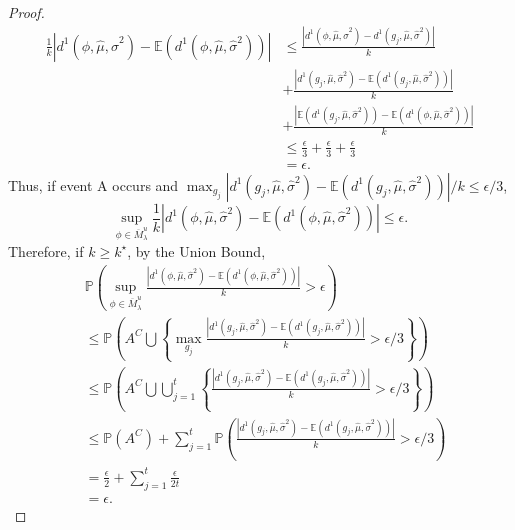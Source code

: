 \documentclass[10pt,a4paper]{amsart}
\begin{document}
\begin{proof}
\begin{equation*}
\begin{split}
           \frac{1}{k}\left |d^1(\phi,\hat{\mu},\hat{\sigma}^2)-\mathbb{E}\left ( d^1(\phi,\hat{\mu},\hat{\sigma}^2)\right )\right |&\leq \frac{ \left |d^1(\phi,\hat{\mu},\hat{\sigma}^2)-d^1(g_j,\hat{\mu},\hat{\sigma}^2) \right |}{k} \\
           & +\frac{\left | d^1(g_j,\hat{\mu},\hat{\sigma}^2)-\mathbb{E}\left ( d^1(g_j,\hat{\mu},\hat{\sigma}^2)\right ) \right |}{k}\\
           & +\frac{\left |\mathbb{E}\left ( d^1(g_j,\hat{\mu},\hat{\sigma}^2)\right )-\mathbb{E}\left ( d^1(\phi,\hat{\mu},\hat{\sigma}^2)\right ) \right |}{k}\\
           &\leq \frac{\epsilon}{3}+\frac{\epsilon}{3}+\frac{\epsilon}{3}\\
           &= \epsilon.
        \end{split}
    \end{equation*}
    Thus, if event A occurs and $\max_{g_j}\left | d^1(g_j,\hat{\mu},\hat{\sigma}^2)-\mathbb{E}\left ( d^1(g_j,\hat{\mu},\hat{\sigma}^2)\right ) \right |/k\leq \epsilon/3$,
    $$\sup_{\phi \in \overline{M}^u_\lambda}\frac{1}{k}\left |d^1(\phi,\hat{\mu},\hat{\sigma}^2)-\mathbb{E}\left ( d^1(\phi,\hat{\mu},\hat{\sigma}^2)\right )\right | \leq \epsilon.$$
    Therefore, if $k\geq k^\star$, by the Union Bound,
    \begin{equation*}
        \begin{split}
            & \mathbb{P}\left (\sup_{\phi \in \overline{M}^u_\lambda}\frac{|d^1(\phi,\hat{\mu},\hat{\sigma}^2)-\mathbb{E}\left ( d^1(\phi,\hat{\mu},\hat{\sigma}^2)\right )|}{k}>\epsilon\right )\\
            &\leq \mathbb{P}\left ( A^C \bigcup \left \{\max_{g_j} \frac{\left | d^1(g_j,\hat{\mu},\hat{\sigma}^2)-\mathbb{E}\left ( d^1(g_j,\hat{\mu},\hat{\sigma}^2)\right ) \right |}{k}> \epsilon/3 \right \} \right )\\
            & \leq \mathbb{P}\left ( A^C\bigcup  \bigcup_{j=1}^t \left \{ \frac{\left | d^1(g_j,\hat{\mu},\hat{\sigma}^2)-\mathbb{E}\left ( d^1(g_j,\hat{\mu},\hat{\sigma}^2)\right ) \right |}{k}> \epsilon/3 \right \} \right )\\
            &\leq \mathbb{P}\left (A^C \right )+\sum_{j=1}^t \mathbb{P}\left ( \frac{\left | d^1(g_j,\hat{\mu},\hat{\sigma}^2)-\mathbb{E}\left ( d^1(g_j,\hat{\mu},\hat{\sigma}^2)\right ) \right |}{k}> \epsilon/3 \right )\\
            &=\frac{\epsilon}{2}+\sum_{j=1}^t \frac{\epsilon}{2t} \\
            &= \epsilon.
        \end{split}
    \end{equation*}
\end{proof}
\end{document}
